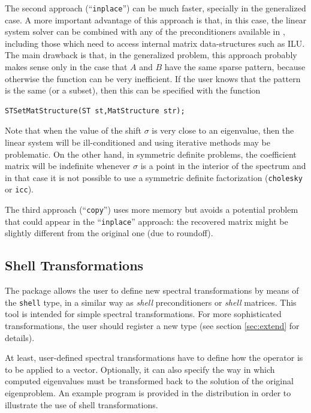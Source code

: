 	The second approach (``\Verb!inplace!'') can be much faster, specially in the generalized case. A more important advantage of this approach is that, in this case, the linear system solver can be combined with any of the preconditioners available in \petsc, including those which need to access internal matrix data-structures such as ILU. The main drawback is that, in the generalized problem, this approach probably makes sense only in the case that $A$ and $B$ have the same sparse pattern, because otherwise the function  can be very inefficient. 
If the user knows that the pattern is the same (or a subset), then this can be specified with the function
	\begin{Verbatim}[fontsize=\small]
	STSetMatStructure(ST st,MatStructure str);
	\end{Verbatim}
	
	Note that when the value of the shift $\sigma$ is very close to an eigenvalue, then the linear system will be ill-conditioned and using iterative methods may be problematic. On the other hand, in symmetric definite problems, the coefficient matrix will be indefinite whenever $\sigma$ is a point in the interior of the spectrum and in that case it is not possible to use a symmetric definite factorization (\texttt{cholesky} or \texttt{icc}).

	The third approach (``\Verb!copy!'') uses more memory but avoids a potential problem that could appear in the ``\Verb!inplace!'' approach: the recovered matrix might be slightly different from the original one (due to roundoff).

\subsection{Shell Transformations}
\label{sec:shell}

	The  package allows the user to define new spectral transformations by means of the \texttt{shell} type, in a similar way as \emph{shell} preconditioners or \emph{shell} matrices. This tool is intended for simple spectral transformations. For more sophisticated transformations, the user should register a new  type (see section \ref{sec:extend} for details).

	At least, user-defined spectral transformations have to define how the operator is to be applied to a vector. Optionally, it can also specify the way in which computed eigenvalues must be transformed back to the solution of the original eigenproblem. An example program is provided in the \slepc distribution in order to illustrate the use of shell transformations.

